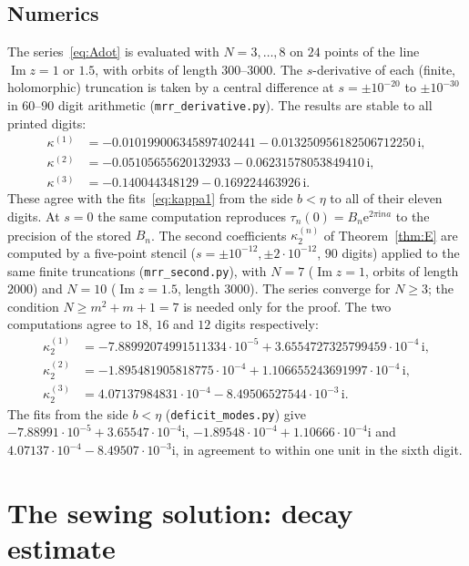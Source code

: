 \documentclass[11pt]{amsart}
\theoremstyle{definition}
\newcommand{\eee}{\mathrm{e}}
\newcommand{\ii}{\mathrm{i}}
\begin{document}
\subsection{Numerics}
The series~\eqref{eq:Adot} is evaluated with $N=3,\dots,8$ on $24$ points of
the line $\operatorname{Im}z=1$ or $1.5$, with orbits of length $300$--$3000$.
The $s$-derivative of each (finite, holomorphic) truncation is taken by a
central difference at $s=\pm10^{-20}$ to $\pm10^{-30}$ in $60$--$90$ digit
arithmetic (\texttt{mrr\_derivative.py}).  The results are stable to all
printed digits:
\[
\begin{aligned}
 \kappa^{(1)}&=-0.010199006345897402441-0.013250956182506712250\,\ii,\\
 \kappa^{(2)}&=-0.05105655620132933-0.06231578053849410\,\ii,\\
 \kappa^{(3)}&=-0.140044348129-0.169224463926\,\ii .
\end{aligned}
\]
These agree with the fits~\eqref{eq:kappa1} from the side $b<\eta$ to all of their
eleven digits.  At $s=0$ the same computation reproduces
$\tau_n(0)=B_n\eee^{2\pi\ii na}$ to the precision of the stored $B_n$.  The second
coefficients $\kappa^{(n)}_2$ of Theorem~\ref{thm:E} are computed by a
five-point stencil ($s=\pm10^{-12},\pm2\cdot10^{-12}$, $90$ digits) applied to
the same finite truncations (\texttt{mrr\_second.py}), with $N=7$ ($\operatorname{Im}z=1$,
orbits of length $2000$) and $N=10$ ($\operatorname{Im}z=1.5$, length $3000$).  The
series converge for $N\ge3$; the condition $N\ge m^2+m+1=7$ is needed only for
the proof.  The two computations agree to $18$, $16$ and $12$ digits
respectively:
\[
\begin{aligned}
 \kappa^{(1)}_2&=-7.88992074991511334\cdot10^{-5}+3.6554727325799459\cdot10^{-4}\,\ii,\\
 \kappa^{(2)}_2&=-1.895481905818775\cdot10^{-4}+1.106655243691997\cdot10^{-4}\,\ii,\\
 \kappa^{(3)}_2&=4.07137984831\cdot10^{-4}-8.49506527544\cdot10^{-3}\,\ii .
\end{aligned}
\]
The fits from the side $b<\eta$ (\texttt{deficit\_modes.py}) give
$-7.88991\cdot10^{-5}+3.65547\cdot10^{-4}\ii$,
$-1.89548\cdot10^{-4}+1.10666\cdot10^{-4}\ii$ and
$4.07137\cdot10^{-4}-8.49507\cdot10^{-3}\ii$, in agreement to within one unit in
the sixth digit.

\section{The sewing solution: decay estimate}\label{sec:W2}
\end{document}
